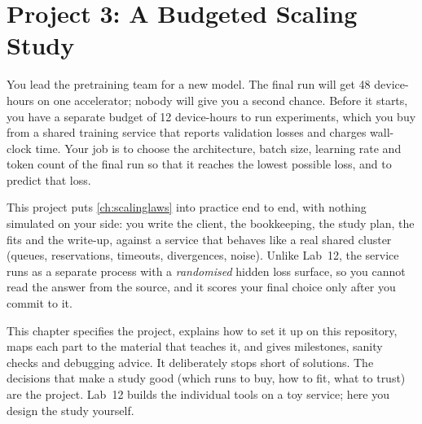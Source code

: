 \chapter{Project 3: A Budgeted Scaling Study}\label{ch:proj3}

You lead the pretraining team for a new model. The final run will get 48 device-hours on one
accelerator; nobody will give you a second chance. Before it starts, you have a separate budget of
12 device-hours to run experiments, which you buy from a shared training service that reports
validation losses and charges wall-clock time. Your job is to choose the architecture, batch size,
learning rate and token count of the final run so that it reaches the lowest possible loss, and to
predict that loss.

This project puts \cref{ch:scalinglaws} into practice end to end, with nothing simulated on your
side: you write the client, the bookkeeping, the study plan, the fits and the write-up, against
a service that behaves like a real shared cluster (queues, reservations, timeouts, divergences,
noise). Unlike Lab~12, the service runs as a separate process with a \emph{randomised} hidden loss
surface, so you cannot read the answer from the source, and it scores your final choice only
after you commit to it.

\begin{keyidea}
This chapter specifies the project, explains how to set it up on this repository, maps each part
to the material that teaches it, and gives milestones, sanity checks and debugging advice. It
deliberately stops short of solutions. The decisions that make a study good (which runs to buy,
how to fit, what to trust) are the project. Lab~12 builds the individual tools on a toy
service; here you design the study yourself.
\end{keyidea}

